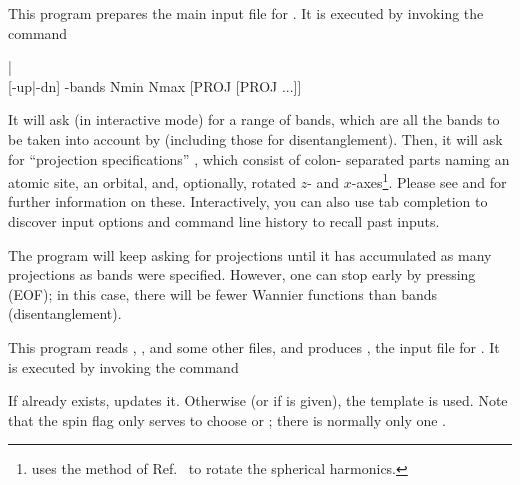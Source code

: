 This program prepares the main input file  for
\wiiw.  It is executed by invoking the command
%
\begin{usage}
  \writeinwf [-up|-dn]  |
  \\
  \writeinwf{} [-up|-dn] -bands Nmin Nmax [PROJ [PROJ ...]]
\end{usage}
%
It will ask (in interactive mode) for a range of bands, which are all
the bands to be taken into account by \wiiw (including those for
disentanglement).  Then, it will ask for ``projection specifications''
, which consist of colon-
separated parts naming an atomic site, an orbital, and, optionally,
rotated $z$- and $x$-axes\footnote{\writeinwf uses the method of
  Ref.~\cite{ylmrot} to rotate the spherical harmonics.}.  Please see
 and 
for further information on these.  Interactively, you can also use tab
completion to discover input options and command line history to
recall past inputs.

The program will keep asking for projections until it has accumulated
as many projections as bands were specified.  However, one can stop
early by pressing  (EOF); in this case, there will be
fewer Wannier functions than bands (disentanglement).






This program reads , , and some
other files, and produces , the input file for
\wannierx.  It is executed by invoking the command
%
\begin{usage}
  \writewin [-up|-dn] [-fresh]
\end{usage}

If  already exists,  updates it.
Otherwise (or if  is given), the template
 is used.  Note that the spin
flag  only serves to choose  or
; there is normally only one .


